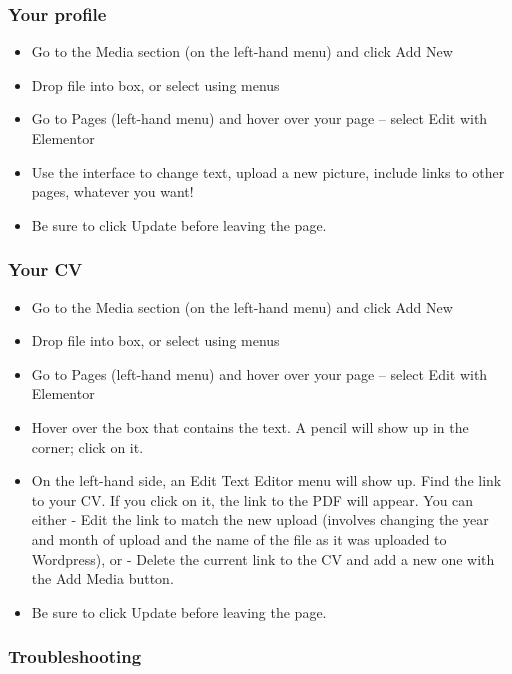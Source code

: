 \documentclass[]{book}
\providecommand{\tightlist}{%
  \setlength{\itemsep}{0pt}\setlength{\parskip}{0pt}}
\begin{document}
\hypertarget{your-profile}{%
\subsubsection{Your profile}\label{your-profile}}

\begin{itemize}
\tightlist
\item
  Go to the Media section (on the left-hand menu) and click Add New
\item
  Drop file into box, or select using menus
\item
  Go to Pages (left-hand menu) and hover over your page -- select Edit with Elementor
\item
  Use the interface to change text, upload a new picture, include links to other pages, whatever you want!
\item
  Be sure to click Update before leaving the page.
\end{itemize}

\hypertarget{your-cv}{%
\subsubsection{Your CV}\label{your-cv}}

\begin{itemize}
\tightlist
\item
  Go to the Media section (on the left-hand menu) and click Add New
\item
  Drop file into box, or select using menus
\item
  Go to Pages (left-hand menu) and hover over your page -- select Edit with Elementor
\item
  Hover over the box that contains the text. A pencil will show up in the corner; click on it.
\item
  On the left-hand side, an Edit Text Editor menu will show up. Find the link to your CV. If you click on it, the link to the PDF will appear. You can either
  - Edit the link to match the new upload (involves changing the year and month of upload and the name of the file as it was uploaded to Wordpress), or
  - Delete the current link to the CV and add a new one with the Add Media button.
\item
  Be sure to click Update before leaving the page.
\end{itemize}

\hypertarget{troubleshooting}{%
\subsubsection{Troubleshooting}\label{troubleshooting}}
\end{document}
